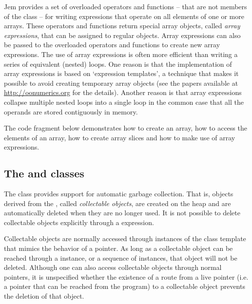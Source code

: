 Jem provides a set of overloaded operators and functions -- that are not
members of the  class -- for writing expressions that operate
on all elements of one or more arrays. These operators and functions
return special array objects, called \emph{array expressions}, that can
be assigned to regular  objects. Array expressions can also
be passed to the overloaded operators and functions to create new array
expressions. The use of array expressions is often more efficient than
writing a series of equivalent (nested) loops. One reason is that the
implementation of array expressions is based on `expression templates', a
technique that makes it possible to avoid creating temporary array
objects (see the papers available at \url{http://oonumerics.org} for the
details). Another reason is that array expressions collapse multiple
nested loops into a single loop in the common case that all the operands
are stored contiguously in memory.

The code fragment below demonstrates how to create an array, how to
access the elements of an array, how to create array slices and how to
make use of array expressions.



\subsection*{The  and  classes}

The  class provides support for automatic garbage
collection. That is, objects derived from the , called
\emph{collectable objects}, are created on the heap and are automatically
deleted when they are no longer used. It is not possible to delete
collectable objects explicitly through a  expression.

Collectable objects are normally accessed through instances of the class
template  that mimics the behavior of a pointer. As long as a
collectable object can be reached through a  instance, or a
sequence of  instances, that object will not be deleted.
Although one can also access collectable objects through normal pointers,
it is unspecified whether the existence of a route from a live pointer
(i.e. a pointer that can be reached from the program) to a
collectable object prevents the deletion of that object.

